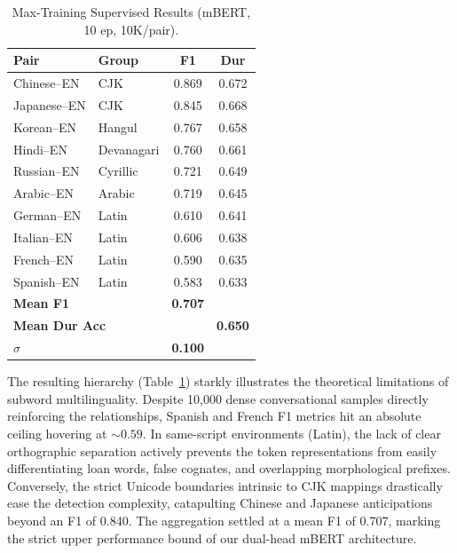 \documentclass[sigconf,nonacm]{acmart}
\begin{document}
\begin{table}[h]
\centering
\small
\caption{Max-Training Supervised Results (mBERT, 10 ep, 10K/pair).}
\label{tab:supervised}
\begin{tabular}{llcc}
\toprule
\textbf{Pair} & \textbf{Group} & \textbf{F1} & \textbf{Dur} \\
\midrule
Chinese--EN & CJK & 0.869 & 0.672 \\
Japanese--EN & CJK & 0.845 & 0.668 \\
Korean--EN & Hangul & 0.767 & 0.658 \\
\midrule
Hindi--EN & Devanagari & 0.760 & 0.661 \\
Russian--EN & Cyrillic & 0.721 & 0.649 \\
Arabic--EN & Arabic & 0.719 & 0.645 \\
\midrule
German--EN & Latin & 0.610 & 0.641 \\
Italian--EN & Latin & 0.606 & 0.638 \\
French--EN & Latin & 0.590 & 0.635 \\
Spanish--EN & Latin & 0.583 & 0.633 \\
\midrule
\multicolumn{2}{l}{\textbf{Mean F1}} & \textbf{0.707} & \\
\multicolumn{2}{l}{\textbf{Mean Dur Acc}} & & \textbf{0.650} \\
\multicolumn{2}{l}{\textbf{$\sigma$}} & \textbf{0.100} & \\
\bottomrule
\end{tabular}
\end{table}

The resulting hierarchy (Table~\ref{tab:supervised}) starkly illustrates the theoretical limitations of subword multilinguality. Despite 10,000 dense conversational samples directly reinforcing the relationships, Spanish and French F1 metrics hit an absolute ceiling hovering at \(\sim 0.59\). In same-script environments (Latin), the lack of clear orthographic separation actively prevents the token representations from easily differentiating loan words, false cognates, and overlapping morphological prefixes. Conversely, the strict Unicode boundaries intrinsic to CJK mappings drastically ease the detection complexity, catapulting Chinese and Japanese anticipations beyond an F1 of 0.840. The aggregation settled at a mean F1 of 0.707, marking the strict upper performance bound of our dual-head mBERT architecture.
\end{document}
